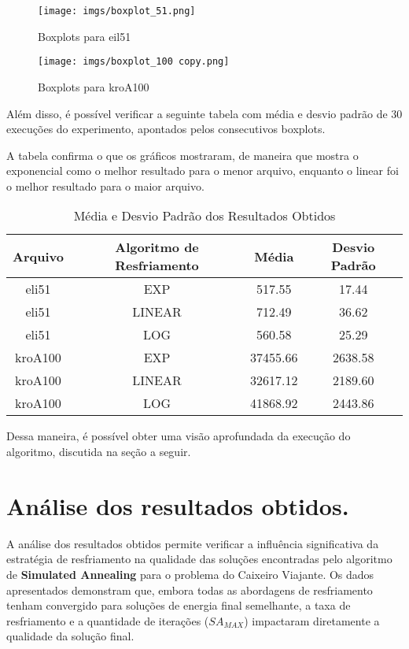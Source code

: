 \documentclass[12pt]{article}
\begin{document}
\begin{figure}[H]
  \centering
  \texttt{[image: imgs/boxplot\_51.png]}
  \caption{Boxplots para eil51}
  \label{fig:boxplot51}
\end{figure}

\begin{figure}[H]
  \centering
  \texttt{[image: imgs/boxplot\_100 copy.png]}
  \caption{Boxplots para kroA100}
  \label{fig:boxplot100}
\end{figure}

Além disso, é possível verificar a seguinte tabela com média e desvio padrão de 30 execuções do experimento, apontados pelos consecutivos boxplots.

A tabela confirma o que os gráficos mostraram, de maneira que mostra o exponencial como o melhor resultado para o menor arquivo, enquanto o linear foi o melhor resultado para o maior arquivo.

\begin{table}[H]
\centering
\caption{Média e Desvio Padrão dos Resultados Obtidos}
\begin{tabular}{|c|c|c|c|}
\hline
\textbf{Arquivo} & \textbf{Algoritmo de Resfriamento} & \textbf{Média} & \textbf{Desvio Padrão} \\ \hline
eli51     & EXP     & 517.55      & 17.44 \\ \hline
eli51     & LINEAR  & 712.49      & 36.62 \\ \hline
eli51     & LOG     & 560.58      & 25.29 \\ \hline
kroA100   & EXP     & 37455.66    & 2638.58 \\ \hline
kroA100   & LINEAR  & 32617.12    & 2189.60 \\ \hline
kroA100   & LOG     & 41868.92    & 2443.86 \\ \hline


\end{tabular}
\label{tab:resultados}
\end{table}


Dessa maneira, é possível obter uma visão aprofundada da execução do algoritmo, discutida na seção a seguir.

\section{Análise dos resultados obtidos.}
\label{sec:analise_dos_resultados_obtidos}

A análise dos resultados obtidos permite verificar a influência significativa da estratégia de resfriamento na qualidade das soluções encontradas pelo algoritmo de \textbf{Simulated Annealing} para o problema do Caixeiro Viajante. Os dados apresentados demonstram que, embora todas as abordagens de resfriamento tenham convergido para soluções de energia final semelhante, a taxa de resfriamento e a quantidade de iterações (\( SA_{MAX} \)) impactaram diretamente a qualidade da solução final.
\end{document}
